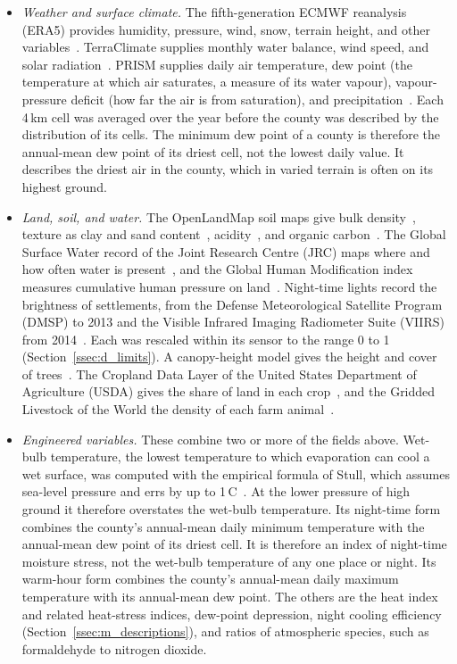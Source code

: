 \documentclass[sensors,article,submit,moreauthors,pdftex]{Definitions/mdpi}
\begin{document}
\begin{itemize}[leftmargin=*, topsep=3pt, itemsep=2pt]
\item \textit{Weather and surface climate.} The fifth-generation ECMWF
reanalysis (ERA5) provides humidity, pressure, wind, snow, terrain height, and
other variables~\cite{Hersbach2020}. TerraClimate supplies monthly water balance,
wind speed, and solar radiation~\cite{Abatzoglou2018}. PRISM supplies daily air temperature, dew
point (the temperature at which air saturates, a measure of its water vapour), vapour-pressure deficit (how far the air is from saturation), and
precipitation~\cite{Daly2008, Daly2015, Daly2021}. Each
4\,km cell was averaged over the year before the county was described by the
distribution of its cells. The minimum dew point of a county is therefore the
annual-mean dew point of its driest cell, not the lowest daily value. It
describes the driest air in the county, which in varied terrain is often on
its highest ground.
\item \textit{Land, soil, and water.} The OpenLandMap soil maps give bulk
density~\cite{Hengl2018}, texture as clay and sand
content~\cite{Hengl2018clay, Hengl2018sand}, acidity~\cite{Hengl2018ph}, and
organic carbon~\cite{Hengl2018oc}. The Global Surface Water record of the Joint Research
Centre (JRC) maps where and how often water is present~\cite{Pekel2016}, and
the Global Human Modification index measures cumulative human pressure on
land~\cite{Kennedy2019}. Night-time lights record the brightness of
settlements, from the Defense Meteorological Satellite Program (DMSP) to 2013
and the Visible Infrared Imaging Radiometer Suite (VIIRS) from
2014~\cite{Elvidge2017}. Each was rescaled within its sensor to the range 0 to
1 (Section~\ref{ssec:d_limits}). A canopy-height model gives the height and cover of
trees~\cite{Tolan2024}. The Cropland Data Layer of the United States
Department of Agriculture (USDA) gives the share of land in each
crop~\cite{Boryan2011}, and the Gridded Livestock of the World the density of
each farm animal~\cite{Gilbert2018}.
\item \textit{Engineered variables.} These combine two or more of the fields
above. Wet-bulb temperature, the lowest temperature to which evaporation can
cool a wet surface, was computed with the empirical formula of Stull, which
assumes sea-level pressure and errs by up to 1\,\textdegree C~\cite{Stull2011}.
At the lower pressure of high ground it therefore overstates the wet-bulb
temperature. Its night-time form combines the county's annual-mean daily
minimum temperature with the annual-mean dew point of its driest cell. It is
therefore an index of night-time moisture stress, not the wet-bulb temperature
of any one place or night. Its warm-hour form combines the county's annual-mean
daily maximum temperature with its annual-mean dew point. The others are the
heat index and related heat-stress
indices, dew-point depression, night cooling efficiency
(Section~\ref{ssec:m_descriptions}), and ratios of atmospheric species, such as
formaldehyde to nitrogen dioxide.
\end{itemize}
\end{document}
